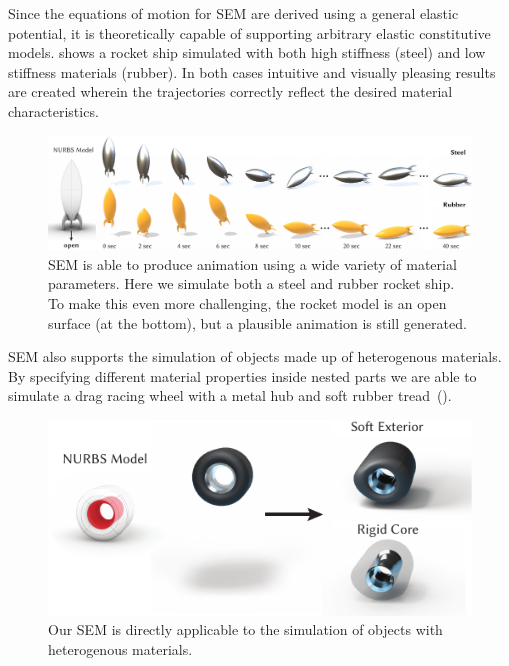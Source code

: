 Since the equations of motion for SEM are derived using a general elastic potential, it is theoretically capable of supporting arbitrary elastic constitutive models.
 shows a rocket ship simulated with both high stiffness (steel) and low stiffness materials (rubber). 
In both cases intuitive and visually pleasing results are created wherein the trajectories correctly reflect the desired material characteristics.  
\begin{figure}[htp]
  \includegraphics[width=\textwidth]{figures/rocket.pdf}
  \caption{SEM is able to produce animation using a wide variety of material parameters. Here we simulate both a steel and rubber rocket ship. 
  To make this even more challenging, the rocket model is an open surface (at the bottom), but a plausible animation is still generated.}
  \label{fig:rocket}
\end{figure}

SEM also supports the simulation of objects made up of heterogenous materials. By specifying different material properties inside nested 
parts we are able to simulate a drag racing wheel with a metal hub and soft rubber tread~().

\begin{figure}[h]
  \includegraphics[width=\columnwidth]{figures/tire}
  \caption{Our SEM is directly applicable to the simulation of objects with heterogenous materials.}
  \label{fig:tire}
\end{figure}


